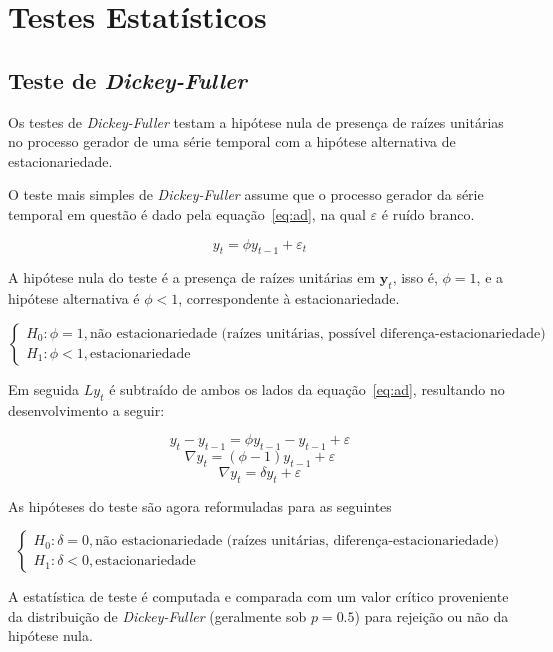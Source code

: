 \chapter{Testes Estatísticos}

\section{Teste de \emph{Dickey-Fuller}}

Os testes de \emph{Dickey-Fuller} testam a hipótese nula de presença de raízes
unitárias no processo gerador de uma série temporal com a hipótese alternativa
de estacionariedade.

O teste mais simples de \emph{Dickey-Fuller} assume que o processo gerador da
série temporal em questão é dado pela equação~\ref{eq:ad}, na qual
$\varepsilon$ é ruído branco.

\begin{equation}\label{eq:ad}
    y_t = \phi y_{t-1} + \varepsilon_t
\end{equation}

A hipótese nula do teste é a presença de raízes unitárias em $\mathbf{y}_t$,
isso é, $\phi = 1$, e a hipótese alternativa é $\phi < 1$, correspondente à
estacionariedade.

$$
\begin{cases}
    H_0: \phi = 1, \text{não estacionariedade (raízes unitárias, possível diferença-estacionariedade)} \\
    H_1: \phi < 1, \text{estacionariedade}
\end{cases}
$$

Em seguida $Ly_t$ é subtraído de ambos os lados da equação~\ref{eq:ad},
resultando no desenvolvimento a seguir:

$$ y_t - y_{t-1} = \phi y_{t-1} - y_{t-1} + \varepsilon $$
$$ \nabla y_t = (\phi - 1) y_{t-1}  + \varepsilon $$
$$ \nabla y_t = \delta y_t  + \varepsilon $$

As hipóteses do teste são agora reformuladas para as seguintes

$$
\begin{cases}
    H_0: \delta = 0, \text{não estacionariedade (raízes unitárias, diferença-estacionariedade)} \\
    H_1: \delta < 0, \text{estacionariedade}
\end{cases}
$$

A estatística de teste é computada e comparada com um valor crítico proveniente
da distribuição de \emph{Dickey-Fuller} (geralmente sob $p=0.5$) para rejeição
ou não da hipótese nula.

